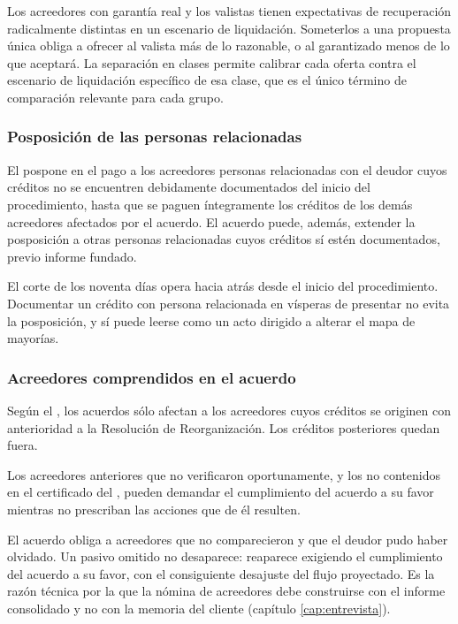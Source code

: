 \begin{foco}
Los acreedores con garantía real y los valistas tienen expectativas de recuperación
radicalmente distintas en un escenario de liquidación. Someterlos a una propuesta única
obliga a ofrecer al valista más de lo razonable, o al garantizado menos de lo que aceptará.
La separación en clases permite calibrar cada oferta contra el escenario de liquidación
específico de esa clase, que es el único término de comparación relevante para cada grupo.
\end{foco}

\subsubsection{Posposición de las personas relacionadas}

El  pospone en el pago a los acreedores personas relacionadas con el deudor cuyos
créditos no se encuentren debidamente documentados  del inicio
del procedimiento, hasta que se paguen íntegramente los créditos de los demás acreedores
afectados por el acuerdo. El acuerdo puede, además, extender la posposición a otras personas
relacionadas cuyos créditos sí estén documentados, previo informe fundado.

\begin{alerta}
El corte de los noventa días opera hacia atrás desde el inicio del procedimiento. Documentar
un crédito con persona relacionada en vísperas de presentar no evita la posposición, y sí
puede leerse como un acto dirigido a alterar el mapa de mayorías.
\end{alerta}

\subsubsection{Acreedores comprendidos en el acuerdo}

Según el , los acuerdos sólo afectan a los acreedores cuyos créditos se originen con
anterioridad a la Resolución de Reorganización. Los créditos posteriores quedan fuera.

Los acreedores anteriores que no verificaron oportunamente, y los no contenidos en el
certificado del , pueden demandar el cumplimiento del acuerdo a su favor mientras no
prescriban las acciones que de él resulten.

\begin{foco}
El acuerdo obliga a acreedores que no comparecieron y que el deudor pudo haber olvidado. Un
pasivo omitido no desaparece: reaparece exigiendo el cumplimiento del acuerdo a su favor,
con el consiguiente desajuste del flujo proyectado. Es la razón técnica por la que la nómina
de acreedores debe construirse con el informe consolidado y no con la memoria del cliente
(capítulo \ref{cap:entrevista}).
\end{foco}


